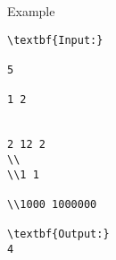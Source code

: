 Example
\begin{verbatim}
\textbf{Input:}

5

1 2


2 12 2
\\
\\1 1

\\1000 1000000

\textbf{Output:}
4
\end{verbatim}